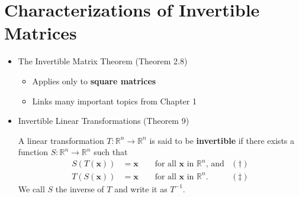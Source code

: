 \documentclass[10pt]{book}
\newenvironment{boxdef}{\begin{mdframed}[backgroundcolor=gray!30,linewidth=0pt,nobreak=true]}{\end{mdframed}}
\newcommand{\R}{\mathbb{R}}
\newcommand{\vect}[1]{\ensuremath{\boldsymbol{\mathbf{#1}}}}
\newcommand{\Tmap}[2]{T:\R^{#1}\to\R^{#2}}
\begin{document}
\newpage


\section{Characterizations of Invertible Matrices}
\begin{itemize}
	\item The Invertible Matrix Theorem (Theorem 2.8)
		\begin{itemize}
			\item Applies only to \textbf{square matrices}
			\item Links many important topics from Chapter 1
		\end{itemize}
	\item Invertible Linear Transformations (Theorem 9)
		\begin{boxdef}
			A linear transformation $\Tmap{n}{n}$ is said to be \textbf{invertible} if there exists a function $S:\R^n\to\R^n$ such that
			\begin{align*}
			S(T(\vect{x})) &= \vect{x} \qquad \text{for all $\vect{x}$ in $\R^n$, and} &(\dagger) \\
			T(S(\vect{x})) &= \vect{x} \qquad \text{for all $\vect{x}$ in $\R^n$}. &(\ddagger)
			\end{align*}
			We call $S$ the inverse of $T$ and write it as $T^{-1}$.
		\end{boxdef}
\end{itemize}
\end{document}
